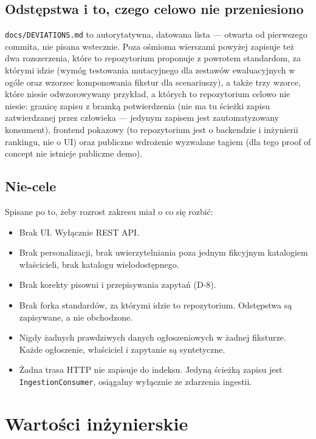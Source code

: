 \documentclass[11pt,a4paper]{article}
\begin{document}
\subsection{Odstępstwa i to, czego celowo nie przeniesiono}

\texttt{docs/DEVIATIONS.md} to autorytatywna, datowana lista --- otwarta od
pierwszego commita, nie pisana wstecznie. Poza ośmioma wierszami powyżej
zapisuje też dwa rozszerzenia, które to repozytorium proponuje z powrotem
standardom, za którymi idzie (wymóg testowania mutacyjnego dla zestawów
ewaluacyjnych w ogóle oraz wzorzec komponowania fikstur dla scenariuszy), a
także trzy wzorce, które niesie odwzorowywany przykład, a których to
repozytorium celowo nie niesie: granicę zapisu z bramką potwierdzenia (nie ma
tu ścieżki zapisu zatwierdzanej przez człowieka --- jedynym zapisem jest
zautomatyzowany konsument), frontend pokazowy (to repozytorium jest o backendzie
i inżynierii rankingu, nie o UI) oraz publiczne wdrożenie wyzwalane tagiem
(dla tego proof of concept nie istnieje publiczne demo).

\subsection{Nie-cele}

Spisane po to, żeby rozrost zakresu miał o co się rozbić:

\begin{itemize}[leftmargin=1.4em]
  \item Brak UI. Wyłącznie REST API.
  \item Brak personalizacji, brak uwierzytelniania poza jednym fikcyjnym
        katalogiem właścicieli, brak katalogu wielodostępnego.
  \item Brak korekty pisowni i przepisywania zapytań (D-8).
  \item Brak forka standardów, za którymi idzie to repozytorium. Odstępstwa są
        zapisywane, a nie obchodzone.
  \item Nigdy żadnych prawdziwych danych ogłoszeniowych w żadnej fiksturze.
        Każde ogłoszenie, właściciel i zapytanie są syntetyczne.
  \item Żadna trasa HTTP nie zapisuje do indeksu. Jedyną ścieżką zapisu jest
        \texttt{IngestionConsumer}, osiągalny wyłącznie ze zdarzenia ingestii.
\end{itemize}

\section{Wartości inżynierskie}
\end{document}
